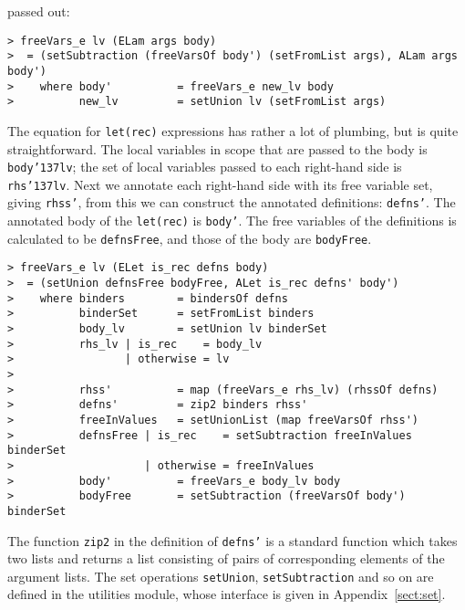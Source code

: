 passed out:
\begin{verbatim}
> freeVars_e lv (ELam args body)
>  = (setSubtraction (freeVarsOf body') (setFromList args), ALam args body')
>    where body'          = freeVars_e new_lv body
>          new_lv         = setUnion lv (setFromList args)
\end{verbatim}
\par
The equation for \mbox{\tt let(rec)} expressions has rather a lot of plumbing,
but is quite straightforward. The local variables in scope that are
passed to the body is \mbox{\tt body{\char'137}lv}; the set of local variables passed to
each right-hand side is \mbox{\tt rhs{\char'137}lv}. Next we annotate each right-hand
side with its free variable set, giving \mbox{\tt rhss'}, from this we can
construct the annotated definitions: \mbox{\tt defns'}. The annotated body of
the \mbox{\tt let(rec)} is \mbox{\tt body'}. The free variables of the definitions is
calculated to be \mbox{\tt defnsFree}, and those of the body are \mbox{\tt bodyFree}.
\begin{verbatim}
> freeVars_e lv (ELet is_rec defns body)
>  = (setUnion defnsFree bodyFree, ALet is_rec defns' body')
>    where binders        = bindersOf defns
>          binderSet      = setFromList binders
>          body_lv        = setUnion lv binderSet
>          rhs_lv | is_rec    = body_lv
>                 | otherwise = lv
>
>          rhss'          = map (freeVars_e rhs_lv) (rhssOf defns)
>          defns'         = zip2 binders rhss'
>          freeInValues   = setUnionList (map freeVarsOf rhss')
>          defnsFree | is_rec    = setSubtraction freeInValues binderSet
>                    | otherwise = freeInValues
>          body'          = freeVars_e body_lv body
>          bodyFree       = setSubtraction (freeVarsOf body') binderSet
\end{verbatim}
The function \mbox{\tt zip2} in the definition of \mbox{\tt defns'} is a standard
function which takes two lists and returns a list consisting of pairs
of corresponding elements of the argument lists.  The set operations
\mbox{\tt setUnion}, \mbox{\tt setSubtraction} and so on are defined in the utilities
module, whose interface is given in Appendix~\ref{sect:set}.

